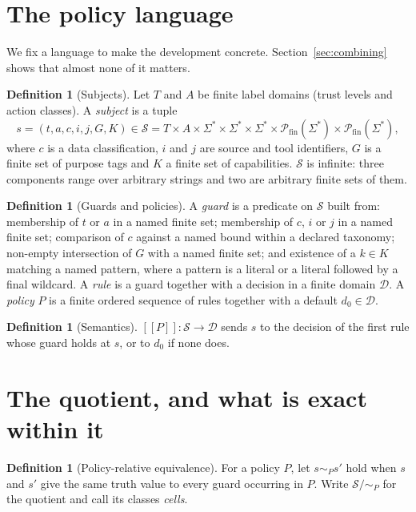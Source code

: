 \documentclass[11pt,a4paper]{article}
\theoremstyle{plain}
\theoremstyle{definition}
\newtheorem{definition}[theorem]{Definition}
\theoremstyle{remark}
\newcommand{\sem}[1]{[\![#1]\!]}
\newcommand{\Dom}{\mathcal{D}}
\newcommand{\Sub}{\mathcal{S}}
\begin{document}
\section{The policy language}
\label{sec:language}

We fix a language to make the development concrete. Section~\ref{sec:combining} shows that
almost none of it matters.

\begin{definition}[Subjects]
Let $T$ and $A$ be finite label domains (trust levels and action classes). A \emph{subject}
is a tuple
\[
  s = (t, a, c, i, j, G, K) \in \Sub
   = T \times A \times \Sigma^{*} \times \Sigma^{*} \times \Sigma^{*}
     \times \mathcal{P}_{\mathrm{fin}}(\Sigma^{*}) \times \mathcal{P}_{\mathrm{fin}}(\Sigma^{*}),
\]
where $c$ is a data classification, $i$ and $j$ are source and tool identifiers, $G$ is a
finite set of purpose tags and $K$ a finite set of capabilities. $\Sub$ is infinite: three
components range over arbitrary strings and two are arbitrary finite sets of them.
\end{definition}

\begin{definition}[Guards and policies]
A \emph{guard} is a predicate on $\Sub$ built from: membership of $t$ or $a$ in a named
finite set; membership of $c$, $i$ or $j$ in a named finite set; comparison of $c$ against a
named bound within a declared taxonomy; non-empty intersection of $G$ with a named finite
set; and existence of a $k \in K$ matching a named pattern, where a pattern is a literal or
a literal followed by a final wildcard. A \emph{rule} is a guard together with a decision in
a finite domain $\Dom$. A \emph{policy} $P$ is a finite ordered sequence of rules together
with a default $d_0 \in \Dom$.
\end{definition}

\begin{definition}[Semantics]
$\sem{P} : \Sub \to \Dom$ sends $s$ to the decision of the first rule whose guard holds at
$s$, or to $d_0$ if none does.
\end{definition}

\section{The quotient, and what is exact within it}
\label{sec:quotient}

\begin{definition}[Policy-relative equivalence]
For a policy $P$, let $s \sim_P s'$ hold when $s$ and $s'$ give the same truth value to
every guard occurring in $P$. Write $\Sub/{\sim_P}$ for the quotient and call its classes
\emph{cells}.
\end{definition}
\end{document}
